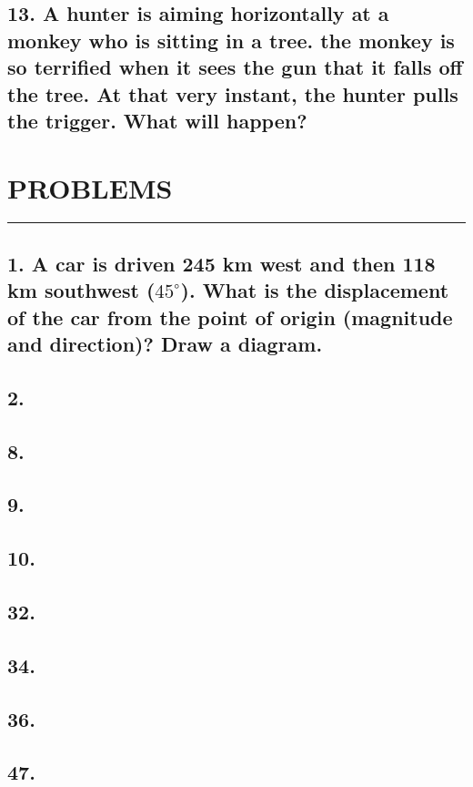 \documentclass[12pt,a4paper,english]{article}
\newcommand{\degree}[1]{${#1}^\circ$}
\begin{document}
\begin{flushleft}
  \subsection{13. A hunter is aiming horizontally at a monkey who is sitting in a tree. the monkey is so terrified when it sees the gun that it falls off the tree. At that very instant, the hunter pulls the trigger. What will happen?}
  \section*{PROBLEMS}
  \hrule
  \subsection{1. A car is driven 245 km west and then 118 km southwest (\degree{45}). What is the displacement of the car from the point of origin (magnitude and direction)? Draw a diagram.}
  \subsection{2. }
  \subsection{8. }
  \subsection{9. }
  \subsection{10. }
  \subsection{32. }
  \subsection{34. }
  \subsection{36. }
  \subsection{47. }

\end{flushleft}
\end{document}
